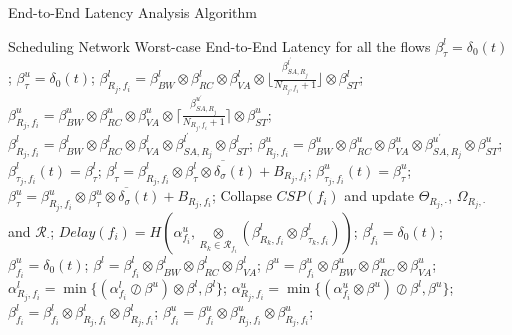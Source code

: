 \documentclass[10pt,journal]{IEEEtran}
\begin{document}
\begin{algorithm}
\caption{End-to-End Latency Analysis Algorithm}
\label{alg:equivalentservicecurve}
\begin{algorithmic}[1]
\REQUIRE Scheduling Network
\ENSURE Worst-case End-to-End Latency for all the flows
        \STATE $\beta_{\tau}^l=\delta_0(t)$; $\beta_{\tau}^u=\delta_0(t)$;
                \STATE $\beta_{R_j,f_i}^l=\beta_{BW}^l\otimes\beta_{RC}^l\otimes\beta_{VA}^l\otimes\lfloor\frac{\beta_{SA,R_j}^{l^\prime}}{N_{R_j,f_i}+1}\rfloor\otimes\beta_{ST}^l$;
                \STATE $\beta_{R_j,f_i}^u=\beta_{BW}^u\otimes\beta_{RC}^u\otimes\beta_{VA}^u\otimes\lceil\frac{\beta_{SA,R_j}^{u^\prime}}{N_{R_j,f_i}+1}\rceil\otimes\beta_{ST}^u$;
            \ELSE
                \STATE $\beta_{R_j,f_i}^l=\beta_{BW}^l\otimes\beta_{RC}^l\otimes\beta_{VA}^l\otimes\beta_{SA,R_j}^{l^\prime}\otimes\beta_{ST}^l$;
                \STATE $\beta_{R_j,f_i}^u=\beta_{BW}^u\otimes\beta_{RC}^u\otimes\beta_{VA}^u\otimes\beta_{SA,R_j}^{u^\prime}\otimes\beta_{ST}^u$;
            \ENDIF
            \STATE $\beta^{l}_{\tau_j,f_i}(t)=\beta_{\tau}^l$; $\beta_{\tau}^l=\overline{\beta^l_{R_j,f_i}\otimes\beta^{l}_{\tau}\otimes\delta_\sigma(t)+B_{R_j,f_i}}$;
            \STATE $\beta^{u}_{\tau_j,f_i}(t)=\beta_{\tau}^u$; $\beta_{\tau}^u=\overline{\beta^u_{R_j,f_i}\otimes\beta^{u}_{\tau}\otimes\delta_\sigma(t)+B_{R_j,f_i}}$;
        \ENDFOR
        \STATE Collapse $CSP(f_i)$ and update $\Theta_{R_j,\cdot}$, $\Omega_{R_j,\cdot}$ and $\mathcal{R}_{\cdot}$;
        \STATE $Delay(f_i)=H(\alpha^u_{f_i},\underset{R_k\in\mathcal{R}_{f_i}}{\otimes}(\beta^l_{R_k,f_i}\otimes\beta^l_{\tau_k,f_i}))$;
        \STATE $\beta_{f_i}^l=\delta_0(t)$; $\beta_{f_i}^u=\delta_0(t)$;
            \STATE $\beta^l=\beta^l_{f_i}\otimes\beta_{BW}^l\otimes\beta_{RC}^l\otimes\beta_{VA}^l$;
            \STATE $\beta^u=\beta^u_{f_i}\otimes\beta_{BW}^u\otimes\beta_{RC}^u\otimes\beta_{VA}^u$;
            \STATE $\alpha^l_{R_j,f_i}=\min\{(\alpha^l_{f_i}\oslash\beta^u)\otimes\beta^l,\beta^l\}$;
            \STATE $\alpha^u_{R_j,f_i}=\min\{(\alpha^u_{f_i}\otimes\beta^u)\oslash\beta^l,\beta^u\}$;
            \STATE $\beta_{f_i}^l=\beta_{f_i}^l\otimes\beta_{R_j,f_i}^l\otimes\beta^l_{R_j,f_i}$;
            \STATE $\beta_{f_i}^u=\beta_{f_i}^u\otimes\beta_{R_j,f_i}^u\otimes\beta_{R_j,f_i}^u$;

\end{algorithmic}
\end{algorithm}
\end{document}
